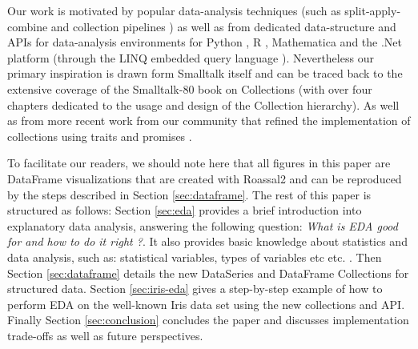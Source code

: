\documentclass[sigplan]{acmart}
\makeatletter
\newcommand*{\etc}{%
    \@ifnextchar{.}%
        {etc}%
        {etc.\@\xspace}%
}
\makeatother
\begin{document}
Our work is motivated by popular data-analysis techniques (such as split-apply-combine \cite{wickham2011split} and collection pipelines \cite{Fowler15}) as well as from dedicated data-structure and APIs for data-analysis environments for Python \cite{McKinney}, R \cite{team2000r}, Mathematica \cite{wolfram1999mathematica} and the .Net platform (through the LINQ embedded query language \cite{meijer2006linq}). Nevertheless our primary inspiration is drawn form Smalltalk itself and can be traced back to the extensive coverage of the Smalltalk-80 book on Collections \cite{Goldberg} (with over four chapters dedicated to the usage and design of the Collection hierarchy). As well as from more recent work from our community that refined the implementation of collections using traits \cite{black2003applying, bourgois2010bloc, scharli2003traits} and promises \cite{Alcocer16}.

To facilitate our readers, we should note here that all figures in this paper are DataFrame visualizations that are created with Roassal2 and can be reproduced by the steps described in Section \ref{sec:dataframe}. The rest of this paper is structured as follows: Section \ref{sec:eda} provides a brief introduction into explanatory data analysis, answering the following question: \textit{What is EDA good for and how to do it right ?}. It also provides basic knowledge about statistics and data analysis, such as: statistical variables, types of variables \etc. Then Section \ref{sec:dataframe} details the new DataSeries and DataFrame Collections for structured data. Section \ref{sec:iris-eda} gives a step-by-step example of how to perform EDA on the well-known Iris data set using the new collections and API. Finally Section \ref{sec:conclusion} concludes the paper and discusses implementation trade-offs as well as future perspectives.





%
%
%
%
\end{document}
